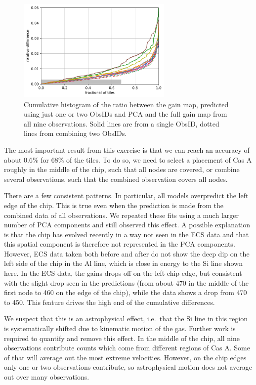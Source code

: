 \documentclass[]{spie}  %
\begin{document}
\begin{figure} [ht]
  \begin{center}
    \includegraphics[height=5cm]{figures/final.pdf}
  \end{center}
  \caption
      {Cumulative histogram of the ratio between the gain map, predicted using just one or two ObsIDs and PCA and the full gain map from all nine observations. Solid lines are from a single ObsID, dotted lines from combining two ObsIDs.
        \label{fig:final}}
\end{figure}

The most important result from this exercise is that we can reach an accuracy of about 0.6\% for 68\% of the tiles. To do so, we need to select a placement of Cas A roughly in the middle of the chip, such that all nodes are covered, or combine several observations, such that the combined observation covers all nodes.

There are a few consistent patterns. In particular, all models overpredict the left edge of the chip. This is true even when the prediction is made from the combined data of all observations. We repeated these fits using a much larger number of PCA components and still observed this effect. A possible explanation is that the chip has evolved recently in a way not seen in the ECS data and that this spatial component is therefore not represented in the PCA components. However, ECS data taken both before and after do not show the deep dip on the left side of the chip in the Al line, which is close in energy to the Si line shown here. In the ECS data, the gains drops off on the left chip edge, but consistent with the slight drop seen in the predictions (from about 470 in the middle of the first node to 460 on the edge of the chip), while the data shows a drop from 470 to 450. This feature drives the high end of the cumulative differences.

We suspect that this is an astrophysical effect, i.e.\ that the Si line in this region is systematically shifted due to kinematic motion of the gas. Further work is required to quantify and remove this effect. In the middle of the chip, all nine observations contribute counts which come from different regions of Cas A. Some of that will average out the most extreme velocities. However, on the chip edges only one or two observations contribute, so astrophysical motion does not average out over many observations.
\end{document}
